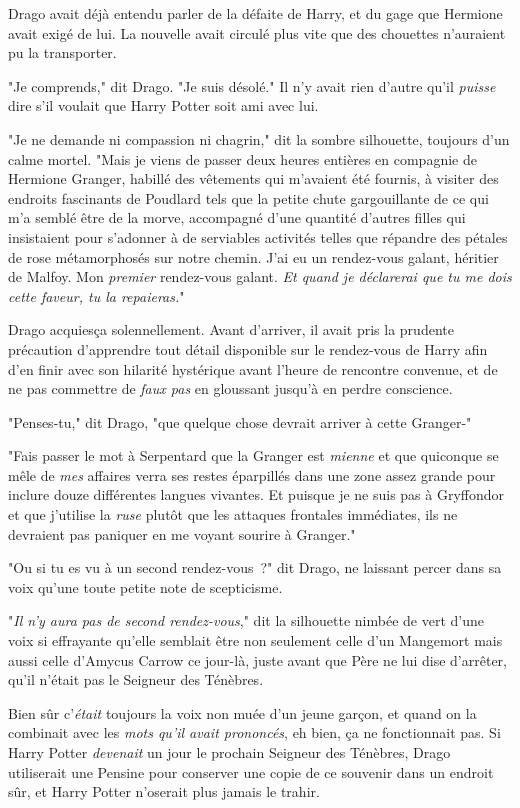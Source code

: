 Drago avait déjà entendu parler de la défaite de Harry, et du gage que Hermione avait exigé de lui. La nouvelle avait circulé plus vite que des chouettes n'auraient pu la transporter.

"Je comprends," dit Drago. "Je suis désolé." Il n'y avait rien d'autre qu'il \emph{puisse} dire s'il voulait que Harry Potter soit ami avec lui.

"Je ne demande ni compassion ni chagrin," dit la sombre silhouette, toujours d'un calme mortel. "Mais je viens de passer deux heures entières en compagnie de Hermione Granger, habillé des vêtements qui m'avaient été fournis, à visiter des endroits fascinants de Poudlard tels que la petite chute gargouillante de ce qui m'a semblé être de la morve, accompagné d'une quantité d'autres filles qui insistaient pour s'adonner à de serviables activités telles que répandre des pétales de rose métamorphosés sur notre chemin. J'ai eu un rendez-vous galant, héritier de Malfoy. Mon \emph{premier} rendez-vous galant. \emph{Et quand je déclarerai que tu me dois cette faveur, tu la repaieras.}"

Drago acquiesça solennellement. Avant d'arriver, il avait pris la prudente précaution d'apprendre tout détail disponible sur le rendez-vous de Harry afin d'en finir avec son hilarité hystérique avant l'heure de rencontre convenue, et de ne pas commettre de \emph{faux pas} en gloussant jusqu'à en perdre conscience.

"Penses-tu," dit Drago, "que quelque chose devrait arriver à cette Granger-"

"Fais passer le mot à Serpentard que la Granger est \emph{mienne} et que quiconque se mêle de \emph{mes} affaires verra ses restes éparpillés dans une zone assez grande pour inclure douze différentes langues vivantes. Et puisque je ne suis pas à Gryffondor et que j'utilise la \emph{ruse} plutôt que les attaques frontales immédiates, ils ne devraient pas paniquer en me voyant sourire à Granger."

"Ou si tu es vu à un second rendez-vous~?" dit Drago, ne laissant percer dans sa voix qu'une toute petite note de scepticisme.

"\emph{Il n'y aura pas de second rendez-vous}," dit la silhouette nimbée de vert d'une voix si effrayante qu'elle semblait être non seulement celle d'un Mangemort mais aussi celle d'Amycus Carrow ce jour-là, juste avant que Père ne lui dise d'arrêter, qu'il n'était pas le Seigneur des Ténèbres.

Bien sûr c'\emph{était} toujours la voix non muée d'un jeune garçon, et quand on la combinait avec les \emph{mots qu'il avait prononcés}, eh bien, ça ne fonctionnait pas. Si Harry Potter \emph{devenait} un jour le prochain Seigneur des Ténèbres, Drago utiliserait une Pensine pour conserver une copie de ce souvenir dans un endroit sûr, et Harry Potter n'oserait plus jamais le trahir.

